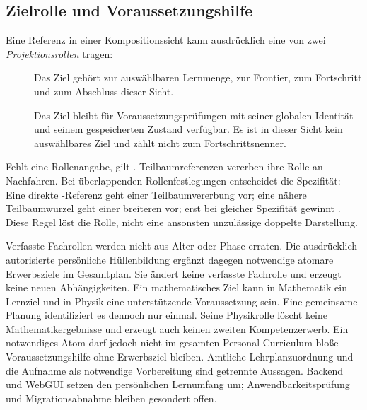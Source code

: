\subsection{Zielrolle und Voraussetzungshilfe}
\label{sec:projection-roles}

Eine Referenz in einer Kompositionssicht kann ausdrücklich eine von
zwei \emph{Projektionsrollen} tragen:

\begin{description}
\item[] Das Ziel gehört zur auswählbaren Lernmenge,
zur Frontier, zum Fortschritt und zum Abschluss dieser Sicht.
\item[] Das Ziel bleibt für
Voraussetzungsprüfungen mit seiner globalen Identität und seinem
gespeicherten Zustand verfügbar. Es ist in dieser Sicht kein
auswählbares Ziel und zählt nicht zum Fortschrittsnenner.
\end{description}

Fehlt eine Rollenangabe, gilt . Teilbaumreferenzen vererben
ihre Rolle an Nachfahren. Bei überlappenden Rollenfestlegungen entscheidet
die Spezifität: Eine direkte -Referenz geht einer
Teilbaumvererbung vor; eine nähere Teilbaumwurzel geht einer breiteren
vor; erst bei gleicher Spezifität gewinnt . Diese Regel
löst die Rolle, nicht eine ansonsten unzulässige doppelte Darstellung.

Verfasste Fachrollen werden nicht aus Alter oder Phase erraten.
Die ausdrücklich autorisierte persönliche Hüllenbildung ergänzt dagegen
notwendige atomare Erwerbsziele im Gesamtplan. Sie ändert keine
verfasste Fachrolle und erzeugt keine neuen Abhängigkeiten.
Ein mathematisches Ziel kann in Mathematik ein Lernziel und in Physik
eine unterstützende Voraussetzung sein. Eine gemeinsame Planung
identifiziert es dennoch nur einmal. Seine Physikrolle löscht keine
Mathematikergebnisse und erzeugt auch keinen zweiten Kompetenzerwerb.
Ein notwendiges Atom darf jedoch nicht im gesamten Personal Curriculum
bloße Voraussetzungshilfe ohne Erwerbsziel bleiben. Amtliche
Lehrplanzuordnung und die Aufnahme als notwendige Vorbereitung sind
getrennte Aussagen. Backend und WebGUI setzen den persönlichen Lernumfang
um; Anwendbarkeitsprüfung und Migrationsabnahme bleiben gesondert offen.

